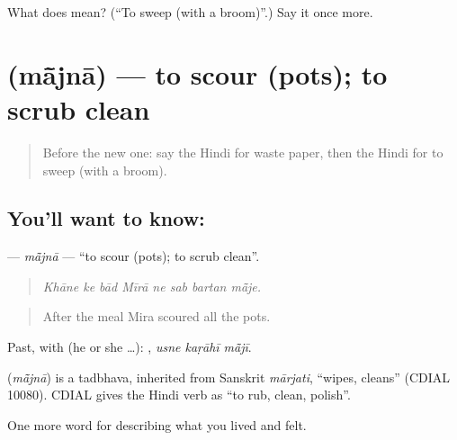 \begin{tcolorbox}[breakable,colback=teal!4,colframe=teal!35!black,title={Before you move on}]
What does  mean? (\textquotedblleft{}To sweep (with a broom)\textquotedblright{}.) Say it once more.
\end{tcolorbox}
\section[\texorpdfstring{\hi{माँजना} (mā̃jnā)}{माँजना (mā̃jnā)}]{ (mā̃jnā) — to scour (pots); to scrub clean}

\label{lesson:HI-C519-majna}



\begin{quote}
Before the new one: say the Hindi for waste paper, then the Hindi for to sweep (with a broom).
\end{quote}

\subsection*{You'll want to know: }
\textbf{} — \emph{mā̃jnā} — \textquotedblleft{}to scour (pots); to scrub clean\textquotedblright{}.

\begin{quote}
       
\end{quote}

\begin{quote}
\emph{Khāne ke bād Mīrā ne sab bartan mā̃je.}
\end{quote}

\begin{quote}
After the meal Mira scoured all the pots.
\end{quote}

Past, with  (he or she …):   , \emph{usne kaṛāhī mā̃jī}.

\begin{cousinweb}
\textbf{} (\emph{mā̃jnā}) is a tadbhava, inherited from Sanskrit \emph{mārjati}, \textquotedblleft{}wipes, cleans\textquotedblright{} (CDIAL 10080). CDIAL gives the Hindi verb as \textquotedblleft{}to rub, clean, polish\textquotedblright{}.
\end{cousinweb}

\begin{grammarlens}[title={What you've built}]
One more word for describing what you lived and felt.
\end{grammarlens}

